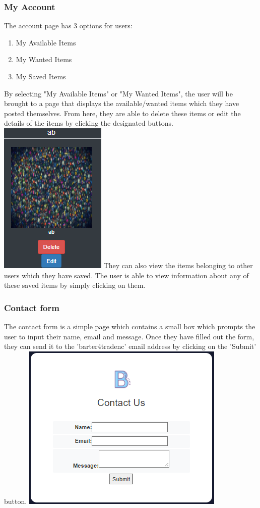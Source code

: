\subsubsection{My Account}
The account page has 3 options for users:
\begin{enumerate}
  \item My Available Items
  \item My Wanted Items
  \item My Saved Items
\end{enumerate}
By selecting "My Available Items" or "My Wanted Items", the user will be brought to a page that displays the available/wanted items which they have posted themselves. From here, they are able to delete these items or edit the details of the items by clicking the designated buttons.
\newline
\includegraphics{img/fe_editdelete.PNG}
\newline
They can also view the items belonging to other users which they have saved. The user is able to view information about any of these saved items by simply clicking on them. 
\subsubsection{Contact form}
The contact form is a simple page which contains a small box which prompts the user to input their name, email and message. Once they have filled out the form, they can send it to the 'barter4tradenc' email address by clicking on the 'Submit' button.
\newline
\includegraphics{img/fe_contact.PNG}




